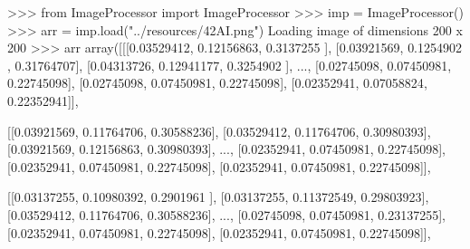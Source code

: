 \documentclass[]{article}
\newenvironment{Shaded}{\begin{snugshade}}{\end{snugshade}}
\newcommand{\DecValTok}[1]{\textcolor[rgb]{0.96,0.45,0.00}{#1}}
\newcommand{\FloatTok}[1]{\textcolor[rgb]{0.96,0.45,0.00}{#1}}
\newcommand{\ImportTok}[1]{\textcolor[rgb]{0.15,0.68,0.38}{#1}}
\newcommand{\NormalTok}[1]{\textcolor[rgb]{0.81,0.81,0.76}{#1}}
\newcommand{\OperatorTok}[1]{\textcolor[rgb]{0.81,0.81,0.76}{#1}}
\newcommand{\StringTok}[1]{\textcolor[rgb]{0.96,0.31,0.31}{#1}}
\begin{document}
\begin{Shaded}
\begin{Highlighting}[]
\OperatorTok{>>>} \ImportTok{from}\NormalTok{ ImageProcessor }\ImportTok{import}\NormalTok{ ImageProcessor}
\OperatorTok{>>>}\NormalTok{ imp }\OperatorTok{=}\NormalTok{ ImageProcessor()}
\OperatorTok{>>>}\NormalTok{ arr }\OperatorTok{=}\NormalTok{ imp.load(}\StringTok{"../resources/42AI.png"}\NormalTok{)}
\NormalTok{Loading image of dimensions }\DecValTok{200}\NormalTok{ x }\DecValTok{200}
\OperatorTok{>>>}\NormalTok{ arr}
\NormalTok{array([[[}\FloatTok{0.03529412}\NormalTok{, }\FloatTok{0.12156863}\NormalTok{, }\FloatTok{0.3137255}\NormalTok{ ],}
\NormalTok{        [}\FloatTok{0.03921569}\NormalTok{, }\FloatTok{0.1254902}\NormalTok{ , }\FloatTok{0.31764707}\NormalTok{],}
\NormalTok{        [}\FloatTok{0.04313726}\NormalTok{, }\FloatTok{0.12941177}\NormalTok{, }\FloatTok{0.3254902}\NormalTok{ ],}
\NormalTok{        ...,}
\NormalTok{        [}\FloatTok{0.02745098}\NormalTok{, }\FloatTok{0.07450981}\NormalTok{, }\FloatTok{0.22745098}\NormalTok{],}
\NormalTok{        [}\FloatTok{0.02745098}\NormalTok{, }\FloatTok{0.07450981}\NormalTok{, }\FloatTok{0.22745098}\NormalTok{],}
\NormalTok{        [}\FloatTok{0.02352941}\NormalTok{, }\FloatTok{0.07058824}\NormalTok{, }\FloatTok{0.22352941}\NormalTok{]],}

\NormalTok{       [[}\FloatTok{0.03921569}\NormalTok{, }\FloatTok{0.11764706}\NormalTok{, }\FloatTok{0.30588236}\NormalTok{],}
\NormalTok{        [}\FloatTok{0.03529412}\NormalTok{, }\FloatTok{0.11764706}\NormalTok{, }\FloatTok{0.30980393}\NormalTok{],}
\NormalTok{        [}\FloatTok{0.03921569}\NormalTok{, }\FloatTok{0.12156863}\NormalTok{, }\FloatTok{0.30980393}\NormalTok{],}
\NormalTok{        ...,}
\NormalTok{        [}\FloatTok{0.02352941}\NormalTok{, }\FloatTok{0.07450981}\NormalTok{, }\FloatTok{0.22745098}\NormalTok{],}
\NormalTok{        [}\FloatTok{0.02352941}\NormalTok{, }\FloatTok{0.07450981}\NormalTok{, }\FloatTok{0.22745098}\NormalTok{],}
\NormalTok{        [}\FloatTok{0.02352941}\NormalTok{, }\FloatTok{0.07450981}\NormalTok{, }\FloatTok{0.22745098}\NormalTok{]],}

\NormalTok{       [[}\FloatTok{0.03137255}\NormalTok{, }\FloatTok{0.10980392}\NormalTok{, }\FloatTok{0.2901961}\NormalTok{ ],}
\NormalTok{        [}\FloatTok{0.03137255}\NormalTok{, }\FloatTok{0.11372549}\NormalTok{, }\FloatTok{0.29803923}\NormalTok{],}
\NormalTok{        [}\FloatTok{0.03529412}\NormalTok{, }\FloatTok{0.11764706}\NormalTok{, }\FloatTok{0.30588236}\NormalTok{],}
\NormalTok{        ...,}
\NormalTok{        [}\FloatTok{0.02745098}\NormalTok{, }\FloatTok{0.07450981}\NormalTok{, }\FloatTok{0.23137255}\NormalTok{],}
\NormalTok{        [}\FloatTok{0.02352941}\NormalTok{, }\FloatTok{0.07450981}\NormalTok{, }\FloatTok{0.22745098}\NormalTok{],}
\NormalTok{        [}\FloatTok{0.02352941}\NormalTok{, }\FloatTok{0.07450981}\NormalTok{, }\FloatTok{0.22745098}\NormalTok{]],}


\end{Highlighting}
\end{Shaded}
\end{document}
